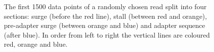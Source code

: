 \begin{figure}
\centering

\caption{\label{fig:start-sections}The first 1500 data points of a randomly chosen read split into four sections: surge (before the red line), stall (between red and orange), pre-adapter surge (between orange and blue) and adapter sequence (after blue). In order from left to right the vertical lines are coloured red, orange and blue.}
\end{figure}
